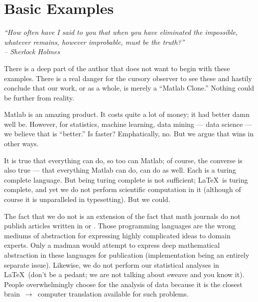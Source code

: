 


\chapter{Basic Examples}


{\it
``How often have I said to you that when you have eliminated the impossible,
whatever remains, however improbable, must be the truth?'' \\
\--- Sherlock Holmes
}
\vspace{0.5cm}


There is a deep part of the author that does not want to begin with these examples.  There is a real danger for the cursory observer to see these and hastily conclude that our work, or  as a whole, is merely a ``Matlab Clone.''  Nothing could be further from reality.

Matlab is an amazing product.  It costs quite a lot of money; it had better damn well be.  However, for statistics, machine learning, data mining --- data science --- we believe that  is ``better.''  Is  faster?  Emphatically, no.  But we argue that  wins in other ways.

It is true that everything  can do, so too can Matlab; of course, the converse is also true --- that everything Matlab can do,  can do as well.  Each is a turing complete language.  But being turing complete is not sufficient; \LaTeX\ is turing complete, and yet we do not perform scientific computation in it (although of course it is unparalleled in typesetting).  But we could.  

The fact that we do not is an extension of the fact that math journals do not publish articles written in  or .  Those programming languages are the wrong mediums of abstraction for expressing highly complicated ideas to domain experts.  Only a madman would attempt to express deep mathematical abstraction in these languages for publication (implementation being an entirely separate issue).  Likewise, we do not perform our statistical analyses in \LaTeX\ (don't be a pedant; we are not talking about sweave and you know it).  People overwhelmingly choose  for the analysis of data because it is the closest brain~$\rightarrow$~computer translation available for such problems.

